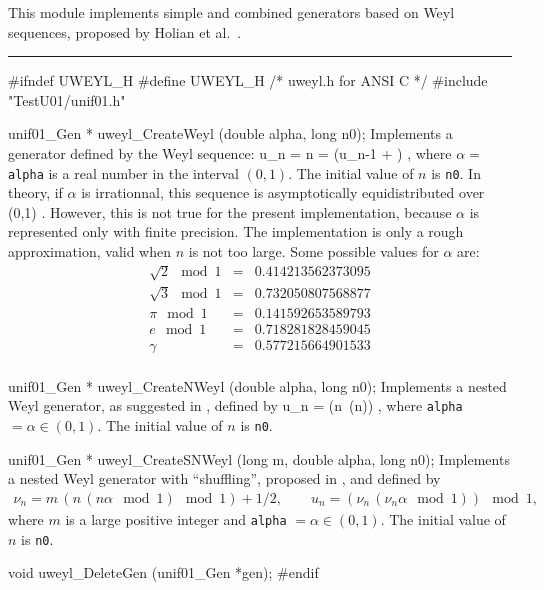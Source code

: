 
This module implements simple and combined generators based on
Weyl sequences, proposed by Holian et al.\ \cite{rHOL94a}.


\bigskip
\hrule
\code
\hide
#ifndef UWEYL_H
#define UWEYL_H
/* uweyl.h for ANSI C */
\endhide
#include "TestU01/unif01.h"


unif01_Gen * uweyl_CreateWeyl (double alpha, long n0);
\endcode
 \tab  Implements a  generator defined by the
 Weyl sequence:
 \eq
   u_n = n \alpha {} = (u_{n-1} + \alpha) ,
 \endeq
 where $\alpha = $ {\tt alpha} is a  real number in the interval $(0,1)$.
 The  initial value of $n$ is {\tt n0}.
 In theory, if $\alpha$ is irrationnal, this sequence is asymptotically
 equidistributed over (0,1) \cite {rWEY16a}.
 However, this is not true for the present
 implementation, because
 $\alpha$ is represented only with finite precision.
 The implementation is only a rough approximation,
 valid when $n$ is not too large.
 Some possible values for $\alpha$ are:
 \begin {eqnarray*}
   \sqrt{2} \mod 1 &=&  0.414213562373095 \\
   \sqrt{3} \mod 1 &=&  0.732050807568877 \\
   \pi      \mod 1 &=&  0.141592653589793 \\
   e        \mod 1 &=&  0.718281828459045 \\
   \gamma          &=&  0.577215664901533 \\
 \end {eqnarray*}
 \endtab
\code

unif01_Gen * uweyl_CreateNWeyl (double alpha, long n0);
\endcode
 \tab  Implements a nested Weyl generator, as suggested in \cite{rHOL94a},
 defined by
 \eq
   u_n = (n\, (n\alpha {})) ,
 \endeq
 where {\tt alpha} $= \alpha \in (0,1)$.
  The initial value of $n$ is {\tt n0}.
 \endtab
\code


unif01_Gen * uweyl_CreateSNWeyl (long m, double alpha, long n0);
\endcode
 \tab  Implements a nested Weyl generator with
 ``shuffling'', proposed in \cite{rHOL94a}, and defined by
 \begin {eqnarray*}
   \nu_n = m\, (n\, (n \alpha \mod 1) \mod 1) + 1/2,
       \qquad u_n   = (\nu_n\, (\nu_n \alpha \mod 1)) \mod 1,
 \end {eqnarray*}
 where $m$ is a large positive integer and  {\tt alpha} $=\alpha \in (0,1)$.
 The initial value of $n$ is {\tt n0}.
 \endtab



\code

void uweyl_DeleteGen (unif01_Gen *gen);
\endcode
 \tab \DelGen
 \endtab
\code
\hide
#endif
\endhide
\endcode
